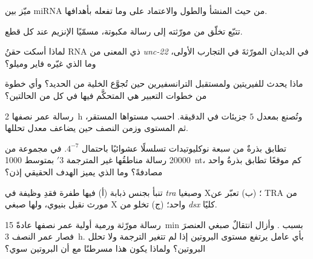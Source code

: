 \begin{exercise}[$\star$]\label{exo:b3:rna-regulation:1}
ميّز بين miRNA   من حيث المنشأ والطول والاعتماد على 
وما تفعله بأهدافها.
\end{exercise}

\begin{exercise}[$\star$]\label{exo:b3:rna-regulation:2}
تتبّع تخلّق  من مورّثته إلى رسالة مكبوتة، مسمّيًا الإنزيم
عند كل قطع.
\end{exercise}

\begin{exercise}[$\star$]\label{exo:b3:rna-regulation:3}
لماذا أسكت حقنُ RNA ذي المعنى من \emph{unc-22} في الديدان المورّثةَ
في التجارب الأولى، وما الذي غيّره فاير وميلو؟
\end{exercise}

\begin{exercise}[$\star$]\label{exo:b3:rna-regulation:4}
ماذا يحدث للفيريتين ولمستقبل الترانسفيرين حين تُجوَّع الخلية من
الحديد؟ وأي خطوة من خطوات التعبير هي المتحكَّم فيها في كل من
الحالتين؟
\end{exercise}

\begin{exercise}[$\star\star$]\label{exo:b3:rna-regulation:5}
رسالة عمر نصفها \qty{2}{h} وتُصنع بمعدل $5$ جزيئات في الدقيقة. احسب
مستواها المستقر، ثم المستوى وزمن النصف حين يضاعف  معدل
تحللها.
\end{exercise}

\begin{exercise}[$\star\star$]\label{exo:b3:rna-regulation:6}
تطابق بذرةٌ من سبعة نوكليوتيدات تسلسلًا عشوائيًا باحتمال $4^{-7}$.
في مجموعة من \num{20000} رسالة مناطقُها غير المترجمة 3$'$ بمتوسط
\qty{1000}{nt}، كم موقعًا تطابق بذرةُ  واحد مصادفةً؟ وما
الذي يميز الهدف الحقيقي إذن؟
\end{exercise}

\begin{exercise}[$\star\star$]\label{exo:b3:rna-regulation:7}
تنبأ بجنس ذبابة (أ) فيها طفرة فقدِ وظيفة في \emph{tra} وصبغيا X؛
(ب) تعبّر عن TRA من مورث نقيل بنيوي، ولها صبغي X واحد؛ (ج) تخلو من
\emph{dsx} كليًا.
\end{exercise}

\begin{exercise}[$\star\star$]\label{exo:b3:rna-regulation:8}
رسالة مورّثة ورمية أولية عمر نصفها عادةً \qty{15}{min} بسبب . وأزال انتقالٌ صبغي العنصرَ فصار عمر النصف \qty{3}{h}. بأي عامل
يرتفع مستوى البروتين إذا لم تتغير الترجمة ولا تحلل البروتين؟ ولماذا
يكون هذا مسرطنًا مع أن البروتين سوي؟
\end{exercise}

